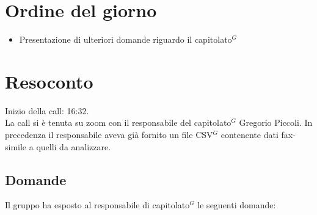 \section{Ordine del giorno}

\begin{itemize}
	\item Presentazione di ulteriori domande riguardo il capitolato$^{G}$
\end{itemize}

\section{Resoconto}

\noindent 
Inizio della call: 16:32.\\
\noindent La call si è tenuta su zoom con il responsabile del capitolato$^{G}$ Gregorio Piccoli. In precedenza il responsabile aveva già fornito un file CSV$^{G}$ contenente dati fax-simile a quelli da analizzare.

\subsection{Domande}
Il gruppo ha esposto al responsabile di capitolato$^{G}$ le seguenti domande:

